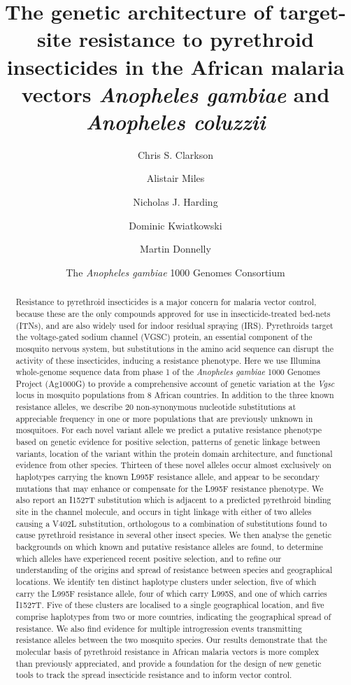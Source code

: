 \documentclass[a4paper,11pt,abstracton,hidelinks]{scrartcl}
\title{
The genetic architecture of target-site resistance to pyrethroid insecticides in the African malaria vectors \emph{Anopheles gambiae} and \emph{Anopheles coluzzii}
}
\author[1]{Chris S. Clarkson}
\author[2,1]{Alistair Miles}
\author[2]{Nicholas J. Harding}
\author[1,2]{Dominic Kwiatkowski}
\author[3,1]{Martin Donnelly}
\author[4]{The \emph{Anopheles gambiae} 1000 Genomes Consortium}
\affil[1]{Wellcome Trust Sanger Institute, Hinxton, Cambridge CB10 1SA}
\affil[2]{Big Data Institute, Old Road, Oxford OX3 7FZ}
\affil[3]{Liverpool School of Tropical Medicine, Pembroke Place, Liverpool L3 5QA}
\affil[4]{https://www.malariagen.net/projects/ag1000g\#people}
\begin{document}
\maketitle


\begin{abstract}


Resistance to pyrethroid insecticides is a major concern for malaria vector control, because these are the only compounds approved for use in insecticide-treated bed-nets (ITNs), and are also widely used for indoor residual spraying (IRS). 
%
Pyrethroids target the voltage-gated sodium channel (VGSC) protein, an essential component of the mosquito nervous system, but substitutions in the amino acid sequence can disrupt the activity of these insecticides, inducing a resistance phenotype. 
%
Here we use Illumina whole-genome sequence data from phase 1 of the \emph{Anopheles gambiae} 1000 Genomes Project (Ag1000G) to provide a comprehensive account of genetic variation at the \emph{Vgsc} locus in mosquito populations from 8 African countries.
%
In addition to the three known resistance alleles, we describe 20 non-synonymous nucleotide substitutions at appreciable frequency in one or more populations that are previously unknown in mosquitoes.
%
For each novel variant allele we predict a putative resistance phenotype based on genetic evidence for positive selection, patterns of genetic linkage between variants, location of the variant within the protein domain architecture, and functional evidence from other species.
%
Thirteen of these novel alleles occur almost exclusively on haplotypes carrying the known L995F resistance allele, and appear to be secondary mutations that may enhance or compensate for the L995F resistance phenotype.
%
We also report an I1527T substitution which is adjacent to a predicted pyrethroid binding site in the channel molecule, and occurs in tight linkage with either of two alleles causing a V402L substitution, orthologous to a combination of substitutions found to cause pyrethroid resistance in several other insect species.
%
We then analyse the genetic backgrounds on which known and putative resistance alleles are found, to determine which alleles have experienced recent positive selection, and to refine our understanding of the origins and spread of resistance between species and geographical locations.
%
We identify ten distinct haplotype clusters under selection, five of which carry the L995F resistance allele, four of which carry L995S, and one of which carries I1527T.
%
Five of these clusters are localised to a single geographical location, and five comprise haplotypes from two or more countries, indicating the geographical spread of resistance.
%
We also find evidence for multiple introgression events transmitting resistance alleles between the two mosquito species.
%
Our results demonstrate that the molecular basis of pyrethroid resistance in African malaria vectors is more complex than previously appreciated, and provide a foundation for the design of new genetic tools to track the spread insecticide resistance and to inform vector control.

\end{abstract}
\end{document}
